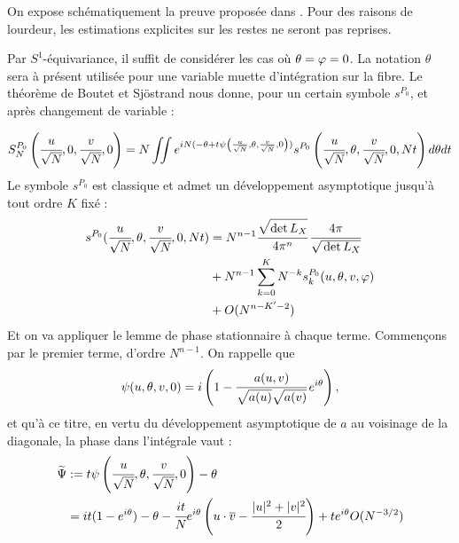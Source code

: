 \begin{preuve}
	On expose schématiquement la preuve proposée dans \cite{Shiffman2002}. Pour des raisons de lourdeur, les estimations explicites sur les restes ne seront pas reprises.
	
	Par $S^1$-équivariance, il suffit de considérer les cas où $\theta = \varphi = 0$. La notation $\theta$ sera à présent utilisée pour une variable muette d'intégration sur la fibre. Le théorème de Boutet et Sj\"ostrand nous donne, pour un certain symbole $s^{P_0}$, et après changement de variable :
	
	\begin{equation*}
	S_N^{P_0}\left(\cfrac{u}{\sqrt{N}},0,\cfrac{v}{\sqrt{N}},0\right) = N \iint e^{iN(-\theta + t\psi\left(\frac{u}{\sqrt{N}},\theta,\frac{v}{\sqrt{N}},0\right))}s^{P_0}\left(\cfrac{u}{\sqrt{N}},\theta, \cfrac{v}{\sqrt{N}},0,Nt\right)d\theta dt
	\end{equation*}
	Le symbole $s^{P_0}$ est classique et admet un développement asymptotique jusqu'à tout ordre $K$ fixé :
	\begin{align*}
		s^{P_0}(\cfrac{u}{\sqrt{N}},\theta,\cfrac{v}{\sqrt{N}},0,Nt)&=N^{n-1}\cfrac{\sqrt{\det{\vphantom{\hat{A}}L_X}}}{4\pi^n}\,\cfrac{4\pi}{\sqrt{\vphantom{A}\det L_X}}\\
		&+ N^{n-1}\sum_{k=0}^{K}N^{-k}s^{P_0}_k(u,\theta,v,\fii)\\
		&+O(N^{n-K'-2})
	\end{align*}
	Et on va appliquer le lemme de phase stationnaire à chaque terme. Commençons par le premier terme, d'ordre $N^{n-1}$. On rappelle que 
	\begin{equation*}
	\psi(u,\theta,v,0) = i\left(1-\cfrac{a(u,v)}{\sqrt{a(u)}\sqrt{a(v)}}\,e^{i\theta}\right),
	\end{equation*}
	et qu'à ce titre, en vertu du développement asymptotique de $a$ au voisinage de la diagonale, la phase dans l'intégrale vaut :
	\begin{align*}
	\widetilde{\Psi} &:= t\psi\left(\cfrac{u}{\sqrt{N}},\theta,\cfrac{v}{\sqrt{N}},0\right) -\theta\\&= it(1-e^{i\theta}) - \theta - \cfrac{it}{N}e^{i\theta}\left(u\cdot\overline{v} - \cfrac {|u|^2+|v|^2}{2}\right) + t e^{i\theta}O(N^{-3/2})
	\end{align*}
	

\end{preuve}
